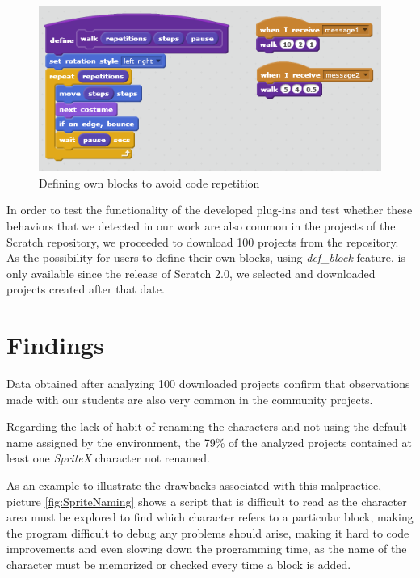 \documentclass[conference]{format/IEEEtran}
\begin{document}
\begin{figure}
  \centering
    \includegraphics{img/CodeRepetition2.png}
  \caption{Defining own blocks to avoid code repetition}
  \label{fig:CodeRepetition2}
\end{figure}


In order to test the functionality of the developed plug-ins and test whether these behaviors that we detected in our work are also common in the projects of the Scratch repository, we proceeded to download 100 projects from the repository. As the possibility for users to define their own blocks, using \textit{def\_block} feature, is only available since the release of Scratch 2.0, we selected and downloaded projects created after that date.


\section{Findings}
\label{sec:findings}

Data obtained after analyzing 100 downloaded projects confirm that observations made with our students are also very common in the community projects.

Regarding the lack of habit of renaming the characters and not using the default name assigned by the environment, the 79\% of the analyzed projects contained at least one \textit{SpriteX} character not renamed.

As an example to illustrate the drawbacks associated with this malpractice, picture \ref{fig:SpriteNaming} shows a script that is difficult to read as the character area must be explored to find which character refers to a particular block, making the program difficult to debug any problems should arise, making it hard to code improvements and even slowing down the programming time, as the name of the character must be memorized or checked every time a block is added. 
\end{document}
